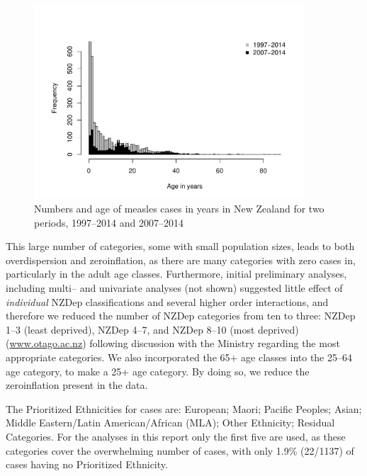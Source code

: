\documentclass{article}
\begin{document}
\begin{figure}
     \begin{center}
     \includegraphics[width=0.9\textwidth]{case_age_dist.pdf}
     \end{center}
\caption{Numbers and age of measles cases in years in New Zealand for two periods, 1997--2014 and 2007--2014}
\label{fig:ageinyears}
\end{figure}

This large number of categories, some with small population sizes, leads to both overdispersion and zeroinflation, as there are many categories with zero cases in, particularly in the adult age classes. Furthermore, initial preliminary analyses, including multi-- and univariate analyses (not shown) suggested little effect of \textit{individual} NZDep classifications and several higher order interactions, and therefore we reduced the number of NZDep categories from ten to three: NZDep 1--3 (least deprived), NZDep 4--7, and NZDep 8--10 (most deprived) (\href{http://www.otago.ac.nz/wellington/research/hirp/otago020194.html}{www.otago.ac.nz}) following discussion with the Ministry regarding the most appropriate categories. We also incorporated the 65+ age classes into the 25--64 age category, to make a 25+ age category. By doing so, we reduce the zeroinflation present in the data. 

The Prioritized Ethnicities for cases are:  European; Maori; Pacific Peoples; Asian; Middle Eastern/Latin American/African (MLA); Other Ethnicity; Residual Categories. For the analyses in this report only the first five are used, as these categories cover the overwhelming number of cases, with only 1.9\% (22/1137) of cases having no Prioritized Ethnicity. 
\end{document}
